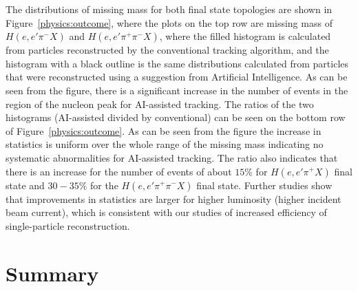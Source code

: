 The distributions of missing mass for both final state topologies are shown in Figure~\ref{physics:outcome}, where the plots 
on the top row are missing mass of $H(e,e'\pi^-X)$ and $H(e,e'\pi^+\pi^-X)$, where the filled histogram is calculated from 
particles reconstructed by the conventional tracking algorithm, and the histogram with a black outline is the same distributions 
calculated from particles that were reconstructed using a suggestion from Artificial Intelligence. As can be seen from the figure, 
there is a significant increase in the number of events in the region of the nucleon peak for AI-assisted
tracking. The ratios of the two histograms (AI-assisted divided by conventional) can be seen on the bottom row of 
Figure~\ref{physics:outcome}. As can be seen from the figure the increase in statistics is uniform over the whole range of the 
missing mass indicating no systematic abnormalities for AI-assisted tracking. The ratio also indicates that there is an increase 
for the number of events of about $15\%$ for $H(e,e'\pi^+X)$ final state and $30-35\%$ for the $H(e,e'\pi^+\pi^-X)$
final state. Further studies show that improvements in statistics are larger for higher luminosity (higher incident beam current), 
which is consistent with our studies of increased efficiency of single-particle reconstruction.

\section{Summary}

